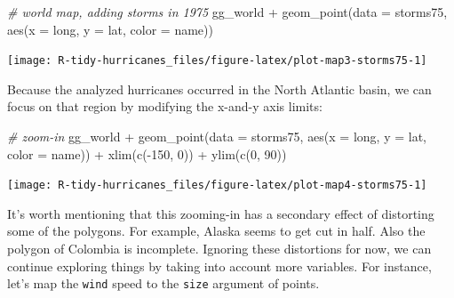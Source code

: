 \documentclass[
]{book}
\newenvironment{Shaded}{\begin{snugshade}}{\end{snugshade}}
\newcommand{\AttributeTok}[1]{\textcolor[rgb]{0.77,0.63,0.00}{#1}}
\newcommand{\CommentTok}[1]{\textcolor[rgb]{0.56,0.35,0.01}{\textit{#1}}}
\newcommand{\DecValTok}[1]{\textcolor[rgb]{0.00,0.00,0.81}{#1}}
\newcommand{\FunctionTok}[1]{\textcolor[rgb]{0.00,0.00,0.00}{#1}}
\newcommand{\NormalTok}[1]{#1}
\newcommand{\SpecialCharTok}[1]{\textcolor[rgb]{0.00,0.00,0.00}{#1}}
\begin{document}
\begin{Shaded}
\begin{Highlighting}[]
\CommentTok{\# world map, adding storms in 1975}
\NormalTok{gg\_world }\SpecialCharTok{+}
  \FunctionTok{geom\_point}\NormalTok{(}\AttributeTok{data =}\NormalTok{ storms75,}
             \FunctionTok{aes}\NormalTok{(}\AttributeTok{x =}\NormalTok{ long, }\AttributeTok{y =}\NormalTok{ lat, }\AttributeTok{color =}\NormalTok{ name))}
\end{Highlighting}
\end{Shaded}

\begin{center}\texttt{[image: R-tidy-hurricanes\_files/figure-latex/plot-map3-storms75-1]} \end{center}

Because the analyzed hurricanes occurred in the North Atlantic basin, we can
focus on that region by modifying the x-and-y axis limits:

\begin{Shaded}
\begin{Highlighting}[]
\CommentTok{\# zoom{-}in}
\NormalTok{gg\_world }\SpecialCharTok{+}
  \FunctionTok{geom\_point}\NormalTok{(}\AttributeTok{data =}\NormalTok{ storms75,}
             \FunctionTok{aes}\NormalTok{(}\AttributeTok{x =}\NormalTok{ long, }\AttributeTok{y =}\NormalTok{ lat, }\AttributeTok{color =}\NormalTok{ name)) }\SpecialCharTok{+}
  \FunctionTok{xlim}\NormalTok{(}\FunctionTok{c}\NormalTok{(}\SpecialCharTok{{-}}\DecValTok{150}\NormalTok{, }\DecValTok{0}\NormalTok{)) }\SpecialCharTok{+} 
  \FunctionTok{ylim}\NormalTok{(}\FunctionTok{c}\NormalTok{(}\DecValTok{0}\NormalTok{, }\DecValTok{90}\NormalTok{))}
\end{Highlighting}
\end{Shaded}

\begin{center}\texttt{[image: R-tidy-hurricanes\_files/figure-latex/plot-map4-storms75-1]} \end{center}

It's worth mentioning that this zooming-in has a secondary effect of distorting
some of the polygons. For example, Alaska seems to get cut in half. Also the
polygon of Colombia is incomplete. Ignoring these distortions for now, we can
continue exploring things by taking into account more variables. For instance,
let's map the \texttt{wind} speed to the \texttt{size} argument of points.
\end{document}
